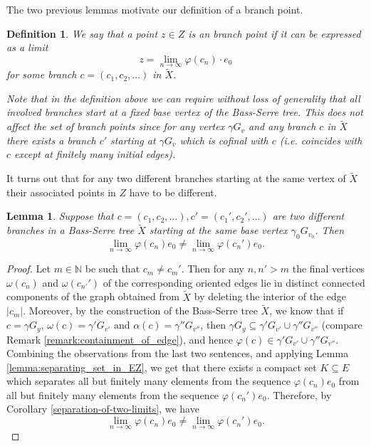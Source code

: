 \documentclass[12pt, a4paper]{article}
\newcommand{\NN}{\mathbb{N}} \newcommand{\ZZ}{\mathbb{Z}}
\newcommand{\8}{\infty}
\theoremstyle{break}
\newtheorem{lm}[thm]{Lemma}
\theoremstyle{defbreak}
\newtheorem{df}[thm]{Definition}
\newcommand{\wtl}[1]{\widetilde{#1}}
\begin{document}
The two previous lemmas motivate our definition of a branch point.\medskip

\begin{df}\label{def:infinite_branch_point}
    We say that a point $z \in Z$ is an \textit{branch point} if it can be expressed as a limit 
    $$z = \lim_{n\to\8}\varphi(c_n)\cdot e_0$$
    for some branch $c = (c_1, c_2, \ldots)$ in $\wtl{X}$.

    Note that in the definition above we can require without loss of generality that all involved branches start at a fixed base vertex of the Bass-Serre tree. This does not affect the set of branch points since for any vertex $\gamma G_v$ and any branch $c$ in $\wtl{X}$ there exists a branch $c'$ starting at $\gamma G_v$ which is cofinal with $c$ (i.e. coincides with $c$
    except at finitely many initial edges).
\end{df}


It turns out that for any two different branches starting at the same vertex of $\wtl{X}$ their associated points in $Z$ have to be different.\medskip

\begin{lm}\label{lemma:different_branch_points}
    Suppose that $c = (c_1, c_2, \ldots), c' = (c_1', c_2', \ldots)$ are two different branches in a Bass-Serre tree $\wtl{X}$ starting at the same base vertex $\gamma_0G_{v_0}$. Then
    $$\lim_{n\to\8}\varphi(c_n)e_0\neq \lim_{n\to\8}\varphi(c_n')e_0.$$
\end{lm}

\begin{proof}
    Let $m\in \NN$ be such that $c_m \neq c_m'$. Then for any $n,n' > m$ the final vertices $\omega(c_n)$ and $\omega(c_{n'}')$ of the corresponding oriented edges
    lie in distinct connected components of the graph obtained from $\wtl{X}$
    by deleting the interior of the edge $|c_m|$. 
    Moreover, by the construction of the Bass-Serre tree $\wtl{X}$,
    we know that if $c=\gamma G_y$, $\omega(c)=\gamma' G_{v'}$ and $\alpha(c)=\gamma'' G_{v''}$,
    then $\gamma G_y\subseteq\gamma' G_{v'}\cup \gamma'' G_{v''}$ (compare Remark \ref{remark:containment_of_edge}), and hence $\varphi(c)\in\gamma' G_{v'}\cup \gamma'' G_{v''}$.
    Combining the observations from the last two sentences, and applying
    Lemma \ref{lemma:separating_set_in_EZ}, we get that there exists a compact set $K\subseteq E$ which separates all but finitely many elements from the sequence $\varphi(c_n)e_0$ from all but finitely many elements from the sequence $\varphi(c_n')e_0$. Therefore, by Corollary \ref{separation-of-two-limits}, we have
    $$\lim_{n\to \8}\varphi(c_n)e_0 \neq \lim_{n\to \8}\varphi(c_n')e_0.$$
\end{proof}
\end{document}
